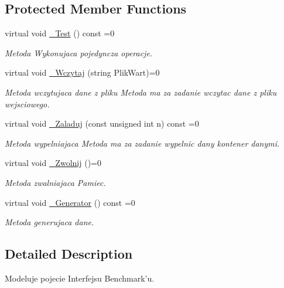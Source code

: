 \subsection*{Protected Member Functions}
\begin{DoxyCompactItemize}
\item 
virtual void \hyperlink{class_benchmark_interfejs_a614b8d69d8af00260210da6308769947}{\-\_\-\-Test} () const =0
\begin{DoxyCompactList}\small\item\em Metoda Wykonujaca pojedyncza operacje. \end{DoxyCompactList}\item 
virtual void \hyperlink{class_benchmark_interfejs_a7980830be212d0ea0ffd2e12b083cd06}{\-\_\-\-Wczytaj} (string Plik\-Wart)=0
\begin{DoxyCompactList}\small\item\em Metoda wczytujaca dane z pliku Metoda ma za zadanie wczytac dane z pliku wejsciowego. \end{DoxyCompactList}\item 
virtual void \hyperlink{class_benchmark_interfejs_a25ad3aa17a7faa3489d82b9f7c763cce}{\-\_\-\-Zaladuj} (const unsigned int n) const =0
\begin{DoxyCompactList}\small\item\em Metoda wypelniajaca Metoda ma za zadanie wypelnic dany kontener danymi. \end{DoxyCompactList}\item 
virtual void \hyperlink{class_benchmark_interfejs_a8a1165914a09368530183ffb968541f1}{\-\_\-\-Zwolnij} ()=0
\begin{DoxyCompactList}\small\item\em Metoda zwalniajaca Pamiec. \end{DoxyCompactList}\item 
virtual void \hyperlink{class_benchmark_interfejs_a69c431ffaa9d2ab995458cc8c6ae5c1f}{\-\_\-\-Generator} () const =0
\begin{DoxyCompactList}\small\item\em Metoda generujaca dane. \end{DoxyCompactList}\end{DoxyCompactItemize}


\subsection{Detailed Description}
Modeluje pojecie Interfejsu Benchmark'u. 

